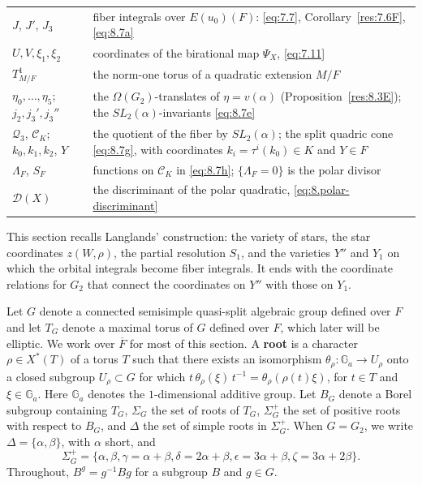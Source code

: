 \documentclass[12pt,letterpaper]{amsart}
\theoremstyle{plain}
\theoremstyle{definition}
\theoremstyle{remark}
\theoremstyle{definition}
\newcommand{\gga}{\mathbb{G}}
\begin{document}
\begin{longtable}{p{}p{}}
$J$, $J'$, $J_3$ & fiber integrals over $E(u_0)(F)$: \eqref{eq:7.7}, Corollary~\ref{res:7.6F}, \eqref{eq:8.7a}\\
$U,V,\xi_1,\xi_2$ & coordinates of the birational map $\Psi_X$, \eqref{eq:7.11}\\
$T^1_{M/F}$ & the norm-one torus of a quadratic extension $M/F$\\
$\eta_0,\dots,\eta_5$; $j_2,j_3',j_3''$ & the $\Omega(G_2)$-translates of $\eta=v(\alpha)$ (Proposition~\ref{res:8.3E}); the $SL_2(\alpha)$-invariants \eqref{eq:8.7e}\\
$\mathcal Q_3$, $\mathcal C_K$; $k_0,k_1,k_2$, $Y$ & the quotient of the fiber by $SL_2(\alpha)$; the split quadric cone \eqref{eq:8.7g}, with coordinates $k_i=\tau^i(k_0)\in K$ and $Y\in F$\\
$\Lambda_F$, $S_F$ & functions on $\mathcal C_K$ in \eqref{eq:8.7h}; $\{\Lambda_F=0\}$ is the polar divisor\\
$\mathscr D(X)$ & the discriminant of the polar quadratic, \eqref{eq:8.polar-discriminant}\\
\bottomrule
\end{longtable}
\endgroup
\label{sec:1}

This section recalls Langlands' construction: the variety of stars, the
star coordinates $z(W,\rho)$, the partial resolution $S_1$, and the
varieties $Y''$ and $Y_1$ on which the orbital integrals become fiber
integrals. It ends with the coordinate relations for $G_2$ that connect the
coordinates on $Y''$ with those on $Y_1$.

Let $G$ denote a connected semisimple
quasi-split algebraic group defined over
$F$ and let $T_G$ denote a maximal torus of $G$ defined
over $F$, which later will be elliptic.
We work over $\overline{F}$ for most of this section.
A \textbf{root} is a character
$\rho\in X^*(T)$ of a torus $T$ such that there exists an isomorphism
$\theta_\rho :\gga_a\rightarrow U_\rho$ onto a closed subgroup
$U_\rho\subset G$ for which $t\,\theta_\rho(\xi)\,t^{-1}=
\theta_\rho(\rho(t)\xi)$, for $t\in T$ and $\xi\in\gga_a$.
Here $\gga_a$ denotes the $1$-dimensional additive group.
Let $B_G$ denote a Borel subgroup containing $T_G$,
$\Sigma_G$ the set of roots of $T_G$, $\Sigma_G^+$ the set of
positive roots with respect to $B_G$,
and $\Delta$ the set of simple roots in $\Sigma_G^+$.
When $G=G_2$, we write
$\Delta=\{\alpha,\beta\}$, with $\alpha$ short, and
\[
\Sigma_G^+=\{\alpha,\beta,\gamma=\alpha+\beta,
\delta=2\alpha+\beta,\epsilon=3\alpha+\beta,
\zeta=3\alpha+2\beta\}.
\]
Throughout, $B^g=g^{-1}Bg$ for a subgroup $B$ and $g\in G$.
\end{document}
